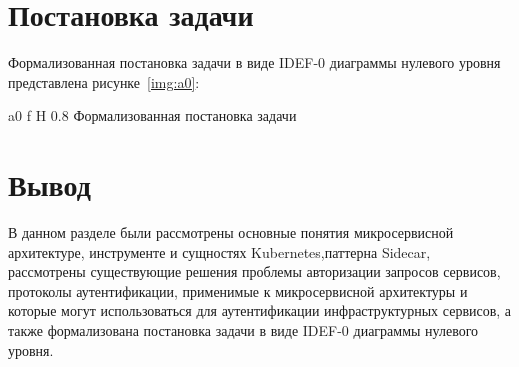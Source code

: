 \section{Постановка задачи}
Формализованная постановка задачи в виде IDEF-0 диаграммы нулевого уровня представлена рисунке~\ref{img:a0}:

    {a0}
    {f}
    {H}
    {0.8\textwidth}
    {Формализованная постановка задачи}


\section*{Вывод}
В данном разделе были рассмотрены основные понятия микросервисной архитектуре, инструменте и сущностях Kubernetes,паттерна Sidecar, рассмотрены существующие решения проблемы авторизации запросов сервисов, протоколы аутентификации, применимые к микросервисной архитектуры и которые могут использоваться для аутентификации инфраструктурных сервисов, а также формализована постановка задачи в виде IDEF-0 диаграммы нулевого уровня.

